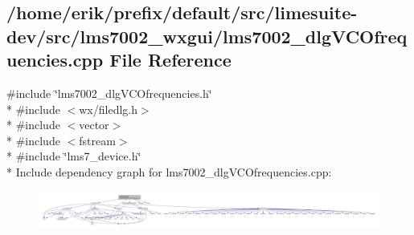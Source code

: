 \subsection{/home/erik/prefix/default/src/limesuite-\/dev/src/lms7002\+\_\+wxgui/lms7002\+\_\+dlg\+V\+C\+Ofrequencies.cpp File Reference}
\label{lms7002__dlgVCOfrequencies_8cpp}
{\ttfamily \#include \char`\"{}lms7002\+\_\+dlg\+V\+C\+Ofrequencies.\+h\char`\"{}}\\*
{\ttfamily \#include $<$wx/filedlg.\+h$>$}\\*
{\ttfamily \#include $<$vector$>$}\\*
{\ttfamily \#include $<$fstream$>$}\\*
{\ttfamily \#include \char`\"{}lms7\+\_\+device.\+h\char`\"{}}\\*
Include dependency graph for lms7002\+\_\+dlg\+V\+C\+Ofrequencies.\+cpp\+:
\nopagebreak
\begin{figure}[H]
\begin{center}
\leavevmode
\includegraphics[width=350pt]{db/d6a/lms7002__dlgVCOfrequencies_8cpp__incl}
\end{center}
\end{figure}
